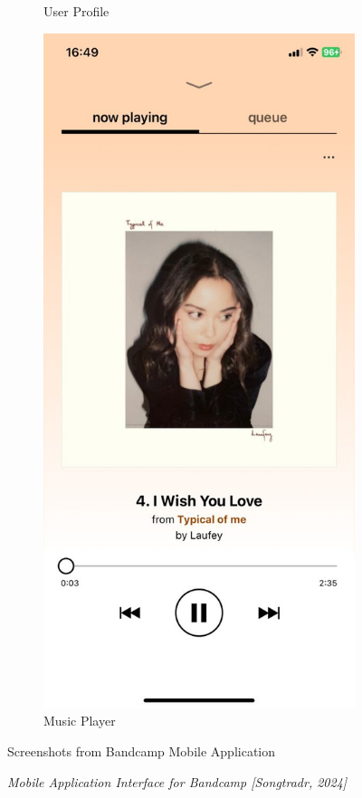 \begin{figure} [h]
\begin{subfigure}{.3\linewidth}
      \caption{User Profile}
      \label{fig:myfig24}
    \end{subfigure}%
    \hspace{1em}%
    \begin{subfigure}{.3\linewidth}
      \centering
      \includegraphics[width = \linewidth]{mainmatter/images/bandcamp3.jpg}
      \caption{Music Player}
      \label{fig:myfig25}
    \end{subfigure}
    \caption{Screenshots from Bandcamp Mobile Application}
    \caption*{\textit{Mobile Application Interface for Bandcamp [Songtradr, 2024]}}
\end{figure}
